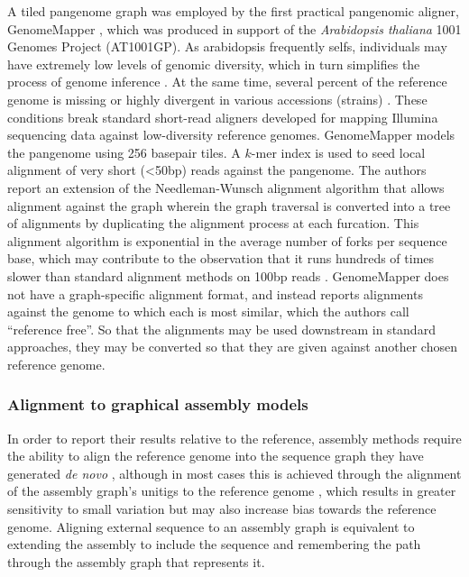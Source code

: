A tiled pangenome graph was employed by the first practical pangenomic aligner, GenomeMapper \cite{schneeberger2009simultaneous}, which was produced in support of the \emph{Arabidopsis thaliana} 1001 Genomes Project (AT1001GP).
As arabidopsis frequently selfs, individuals may have extremely low levels of genomic diversity, which in turn simplifies the process of genome inference \cite{cao2011whole}.
At the same time, several percent of the reference genome is missing or highly divergent in various accessions (strains) \cite{clark2007common,zeller2008detecting}.
These conditions break standard short-read aligners developed for mapping Illumina sequencing data against low-diversity reference genomes.
GenomeMapper models the pangenome using 256 basepair tiles.
A $k$-mer index is used to seed local alignment of very short (<50bp) reads against the pangenome.
The authors report an extension of the Needleman-Wunsch alignment algorithm that allows alignment against the graph wherein the graph traversal is converted into a tree of alignments by duplicating the alignment process at each furcation.
This alignment algorithm is exponential in the average number of forks per sequence base, which may contribute to the observation that it runs hundreds of times slower than standard alignment methods on 100bp reads \cite{liu2016debga}.
GenomeMapper does not have a graph-specific alignment format, and instead reports alignments against the genome to which each is most similar, which the authors call ``reference free''.
So that the alignments may be used downstream in standard approaches, they may be converted so that they are given against another chosen reference genome.

\subsubsection{Alignment to graphical assembly models}

In order to report their results relative to the reference, assembly methods require the ability to align the reference genome into the sequence graph they have generated \emph{de novo} \cite{iqbal2012novo,simpson2012efficient}, although in most cases this is achieved through the alignment of the assembly graph's unitigs to the reference genome \cite{li2015fermikit}, which results in greater sensitivity to small variation but may also increase bias towards the reference genome.
Aligning external sequence to an assembly graph is equivalent to extending the assembly to include the sequence and remembering the path through the assembly graph that represents it.

